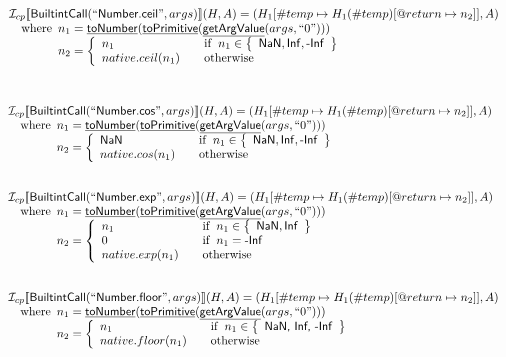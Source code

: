 \documentclass{article}
\newcommand{\SF}[1]{\mbox{\textsf{#1}}}
\newcommand{\wherec}[1]{{\rm where}\begin{array}[t]{l}#1\end{array}}
\newcommand{\ifc}[1]{{\rm if}\begin{array}[t]{l}#1\end{array}}
\newcommand{\owc}{{\rm otherwise}}
\newcommand{\I}{\mathcal{I}}
\newcommand{\set}[1]{\left\{\begin{array}{l}#1\end{array}\right\}}
\newcommand{\lbr}{\llbracket}
\newcommand{\rbr}{\rrbracket}
\newcommand{\hf}[1]{\underline{\sf #1}}
\begin{document}
\[\begin{array}{l}
\I _{cp}\lbr \SF{BuiltintCall}(``\SF{Number.ceil}",args)\rbr(H,A)
  = (H_1[\#temp \mapsto H_1(\#temp)[@return \mapsto n_2]], A)\\
\quad\wherec{
  n_1 = \hf{toNumber}(\hf{toPrimitive}(\hf{getArgValue}(args, ``0")))\\
  n_2 = \left\{
    \begin{array}{l@{\quad\quad}l}
      n_1 & \ifc{n_1 \in \set{\SF{NaN}, \SF{Inf}, \SF{-Inf}}}\\
      native.ceil(n_1) & \owc 
    \end{array}
  \right.
  }\\
\\\\


\end{array}
\]
\[
\begin{array}{l}


\I _{cp}\lbr \SF{BuiltintCall}(``\SF{Number.cos}",args)\rbr(H,A)
  = (H_1[\#temp \mapsto H_1(\#temp)[@return \mapsto n_2]], A)\\
\quad\wherec{
  n_1 = \hf{toNumber}(\hf{toPrimitive}(\hf{getArgValue}(args, ``0")))\\
  n_2 = \left\{
    \begin{array}{l@{\quad\quad}l}
      \SF{NaN} & \ifc{n_1 \in \set{\SF{NaN}, \SF{Inf}, \SF{-Inf}}}\\
      native.cos(n_1) & \owc 
    \end{array}
  \right.
  }\\
\\\\



\I _{cp}\lbr \SF{BuiltintCall}(``\SF{Number.exp}",args)\rbr(H,A)
  = (H_1[\#temp \mapsto H_1(\#temp)[@return \mapsto n_2]], A)\\
\quad\wherec{
  n_1 = \hf{toNumber}(\hf{toPrimitive}(\hf{getArgValue}(args, ``0")))\\
  n_2 = \left\{
    \begin{array}{l@{\quad\quad}l}
      n_1 & \ifc{n_1 \in \set{\SF{NaN}, \SF{Inf}}}\\
      0 & \ifc{n_1=\SF{-Inf}}\\
      native.exp(n_1) & \owc
    \end{array}
  \right.
  }\\
\\\\


\I _{cp}\lbr \SF{BuiltintCall}(``\SF{Number.floor}",args)\rbr(H,A)
  = (H_1[\#temp \mapsto H_1(\#temp)[@return \mapsto n_2]], A)\\
\quad\wherec{
  n_1 = \hf{toNumber}(\hf{toPrimitive}(\hf{getArgValue}(args, ``0")))\\
  n_2 = \left\{
    \begin{array}{l@{\quad\quad}l}
      n_1 & \ifc{n_1 \in \set{\SF{NaN, Inf, -Inf}}}\\
      native.floor(n_1) & \owc
    \end{array}
  \right.
  }\\
\\\\




\end{array}\]
\end{document}
